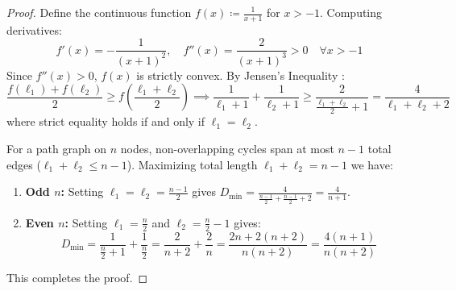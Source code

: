 \begin{proof}
Define the continuous function $f(x) \coloneqq \frac{1}{x+1}$ for $x > -1$. Computing derivatives:
\begin{equation}
	f'(x) = -\frac{1}{(x+1)^2}, \quad f''(x) = \frac{2}{(x+1)^3} > 0 \quad \forall x > -1
\end{equation}
Since $f''(x) > 0$, $f(x)$ is strictly convex. By Jensen's Inequality \cite{perlman1974jensen}:
\begin{equation}\label{eq:ch_RA_jensen_proof}
	\frac{f(\ell_1) + f(\ell_2)}{2} \ge f\left( \frac{\ell_1 + \ell_2}{2} \right) \implies \frac{1}{\ell_1+1} + \frac{1}{\ell_2+1} \ge \frac{2}{\frac{\ell_1+\ell_2}{2} + 1} = \frac{4}{\ell_1 + \ell_2 + 2}
\end{equation}
where strict equality holds if and only if $\ell_1 = \ell_2$.

For a path graph on $n$ nodes, non-overlapping cycles span at most $n-1$ total edges ($\ell_1 + \ell_2 \le n-1$). Maximizing total length $\ell_1 + \ell_2 = n-1$ we have:
\begin{enumerate}
	\item \textbf{Odd $n$:} Setting $\ell_1 = \ell_2 = \frac{n-1}{2}$ gives $D_{\min} = \frac{4}{\frac{n-1}{2} + \frac{n-1}{2} + 2} = \frac{4}{n+1}$.
	\item \textbf{Even $n$:} Setting $\ell_1 = \frac{n}{2}$ and $\ell_2 = \frac{n}{2}-1$ gives:
	\begin{equation}
		D_{\min} = \frac{1}{\frac{n}{2}+1} + \frac{1}{\frac{n}{2}} = \frac{2}{n+2} + \frac{2}{n} = \frac{2n + 2(n+2)}{n(n+2)} = \frac{4(n+1)}{n(n+2)}
	\end{equation}
\end{enumerate}
This completes the proof.
\end{proof}
